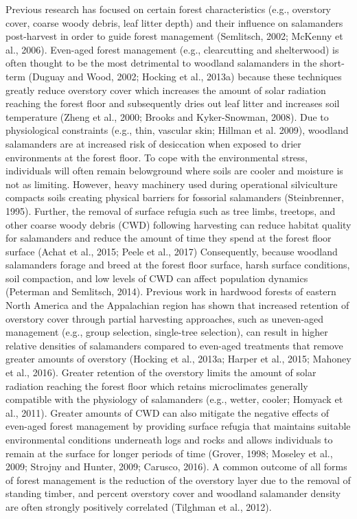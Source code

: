 Previous research has focused on certain forest characteristics (e.g., overstory cover, coarse woody debris, leaf litter depth) and their influence on salamanders post-harvest in order to guide forest management (Semlitsch, 2002; McKenny et al., 2006).
Even-aged forest management (e.g., clearcutting and shelterwood) is often thought to be the most detrimental to woodland salamanders in the short-term (Duguay and Wood, 2002; Hocking et al., 2013a) 
because these techniques greatly reduce overstory cover which increases the amount of solar radiation reaching the forest floor and subsequently dries out leaf litter and increases soil temperature (Zheng et al., 2000; Brooks and Kyker-Snowman, 2008).
Due to physiological constraints (e.g., thin, vascular skin; Hillman et al. 2009), woodland salamanders are at increased risk of desiccation when exposed to drier environments at the forest floor.
To cope with the environmental stress, individuals will often remain belowground where soils are cooler and moisture is not as limiting. 
However, heavy machinery used during operational silviculture compacts soils creating physical barriers for fossorial salamanders (Steinbrenner, 1995).
Further, the removal of surface refugia such as tree limbs, treetops, and other coarse woody debris (CWD) following harvesting can reduce habitat quality for salamanders and reduce the amount of time they spend at the forest floor surface (Achat et al., 2015; Peele et al., 2017)
Consequently, because woodland salamanders forage and breed at the forest floor surface, harsh surface conditions, soil compaction, and low levels of CWD can affect population dynamics (Peterman and Semlitsch, 2014).
Previous work in hardwood forests of eastern North America and the Appalachian region has shown that increased retention of overstory cover through partial harvesting approaches, such as uneven-aged management (e.g., group selection, single-tree selection), 
can result in higher relative densities of salamanders compared to even-aged treatments that remove greater amounts of overstory (Hocking et al., 2013a; Harper et al., 2015; Mahoney et al., 2016).
Greater retention of the overstory limits the amount of solar radiation reaching the forest floor which retains microclimates generally compatible with the physiology of salamanders (e.g., wetter, cooler; Homyack et al., 2011).
Greater amounts of CWD can also mitigate the negative effects of even-aged forest management by providing surface refugia that maintains suitable environmental conditions underneath logs and rocks and allows individuals to remain at the surface for longer periods of time (Grover, 1998; Moseley et al., 2009; Strojny and Hunter, 2009; Carusco, 2016).
A common outcome of all forms of forest management is the reduction of the overstory layer due to the removal of standing timber, and percent overstory cover and woodland salamander density are often strongly positively correlated (Tilghman et al., 2012).



